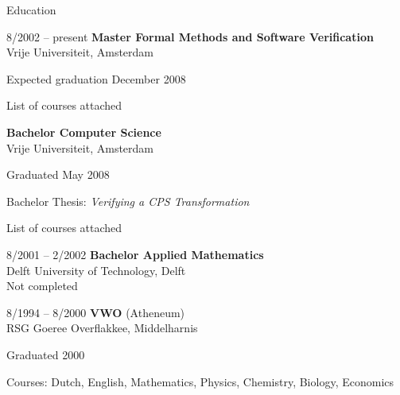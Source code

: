 \documentclass[a4paper,11pt]{article}
\newenvironment{sublist}{%
  \begin{list}{}{%
      \setlength{\itemsep}{0em}\setlength{\parsep}{0em}%
      \setlength{\topsep}{0em}\setlength{\parskip}{0em}%
    }%
}%
{ \end{list} }
\begin{document}
\begin{cv}{}
\begin{cvlist}{Education}
\item[8/2002 -- present]
  {\bf Master Formal Methods and Software Verification}\\
  Vrije Universiteit, Amsterdam
  \begin{sublist}
  \item Expected graduation December 2008
  \item List of courses attached
  \end{sublist}
  {\bf Bachelor Computer Science}\\
  Vrije Universiteit, Amsterdam
  \begin{sublist}
  \item Graduated May 2008
  \item Bachelor Thesis: \textit{Verifying a CPS Transformation}
  \item List of courses attached
  \end{sublist}
\item[8/2001 -- 2/2002]
  {\bf Bachelor Applied Mathematics}\\
  Delft University of Technology, Delft\\
  Not completed
\item[8/1994 -- 8/2000]
  {\bf VWO} (Atheneum)\\
  RSG Goeree Overflakkee,  Middelharnis
  \begin{sublist}
    \item Graduated 2000
    \item Courses: Dutch, English, Mathematics, Physics, Chemistry, Biology, Economics
  \end{sublist}
\end{cvlist}



\end{cv}
\end{document}
